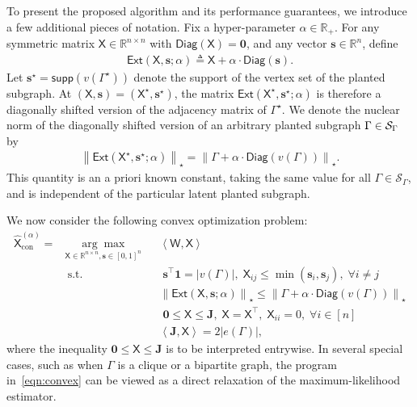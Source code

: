 \documentclass[12pt]{article}
\newcommand{\Jb}{\mathbf{J}}
\newcommand{\calS}{{\cal S}}
\newcommand{\norm}[1]{\left\|#1\right\|}
\newcommand{\innerP}[1]{\left\langle#1\right\rangle}
\newcommand{\s}[1]{\mathsf{#1}}
\begin{document}
To present the proposed algorithm and its performance guarantees, we introduce a few additional pieces of notation. Fix a hyper-parameter $\alpha\in\mathbb{R}_+$. For any symmetric matrix $\s{X}\in\mathbb{R}^{n\times n}$ with $\s{Diag}(\s{X})=\mathbf{0}$, and any vector $\mathbf{s}\in\mathbb{R}^n$, define
\begin{align}
    \s{Ext}(\s{X},\mathbf{s};\alpha)\triangleq \s{X}+\alpha\cdot\s{Diag}(\mathbf{s}).
\end{align}
Let $\mathbf{s}^\star = \s{supp}(v(\Gamma^\star))$ denote the support of the vertex set of the planted subgraph. At $(\s{X},\mathbf{s}) = (\s{X}^\star,\mathbf{s}^\star)$, the matrix $\s{Ext}(\s{X}^\star,\mathbf{s}^\star;\alpha)$ is therefore a diagonally shifted version of the adjacency matrix of $\Gamma^\star$. We denote the nuclear norm of the diagonally shifted version of an arbitrary planted subgraph $\Gamma\in\calS_\Gamma$ by
\begin{align}
    \norm{\s{Ext}(\s{X}^\star,\mathbf{s}^\star;\alpha)}_\star
    =\norm{\Gamma+\alpha\cdot\s{Diag}(v(\Gamma))}_\star.
\end{align}
This quantity is an a priori known constant, taking the same value for all $\Gamma \in \mathcal{S}_\Gamma$, and is independent of the particular latent planted subgraph.

We now consider the following convex optimization problem:
\begin{equation}
\begin{aligned}
\hat{\s{X}}_{\mathrm{con}}^{(\alpha)}=& \underset{\s{X}\in\mathbb{R}^{n\times n},\mathbf{s}\in[0,1]^n}{\arg\max}
& & \innerP{\s{W},\s{X}} \\
& \ \text{s.t.}
& & \;\mathbf{s}^\top\mathbf{1} = |v(\Gamma)|,\;\s{X}_{ij}\leq \min(\mathbf{s}_i,\mathbf{s}_j),\;\forall i\neq j\\
&&&  \norm{\s{Ext}(\s{X},\mathbf{s};\alpha)}_\star\leq\norm{\Gamma+\alpha\cdot\s{Diag}(v(\Gamma))}_\star\\
&&& \;\mathbf{0}\leq\s{X}\leq\mathbf{J},\;\s{X} = \s{X}^\top,\;\s{X}_{ii}=0,\;\forall i\in[n]\\
&&& \innerP{\Jb,\s{X}}=2|e(\Gamma)|,
\end{aligned}\label{eqn:convex}
\end{equation}
where the inequality $\mathbf{0}\leq\s{X}\leq\mathbf{J}$ is to be interpreted entrywise. In several special cases, such as when $\Gamma$ is a clique or a bipartite graph, the program in~\eqref{eqn:convex} can be viewed as a direct relaxation of the maximum-likelihood estimator. 
\end{document}
